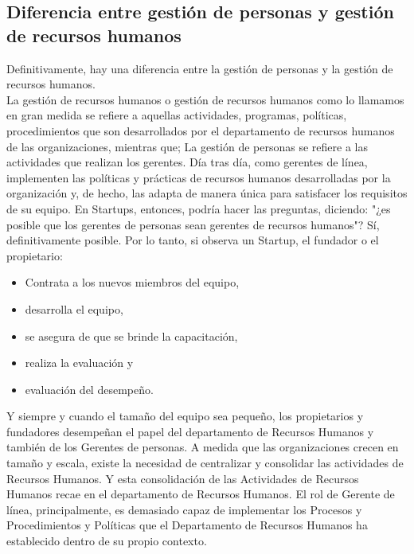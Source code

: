 \documentclass[10pt]{book}
\begin{document}
\subsection{Diferencia entre gestión de personas y gestión de recursos humanos}
Definitivamente, hay una diferencia entre la gestión de personas y la gestión de recursos humanos.\\
La gestión de recursos humanos o gestión de recursos humanos como lo llamamos en gran medida se refiere a aquellas actividades, programas, políticas, procedimientos que son desarrollados por el departamento de recursos humanos de las organizaciones, mientras que; La gestión de personas se refiere a las actividades que realizan los gerentes. Día tras día, como gerentes de línea, implementen las políticas y prácticas de recursos humanos desarrolladas por la organización y, de hecho, las adapta de manera única para satisfacer los requisitos de su equipo. En Startups, entonces, podría hacer las preguntas, diciendo: "¿es posible que los gerentes de personas sean gerentes de recursos humanos"? Sí, definitivamente posible. Por lo tanto, si observa un Startup, el fundador o el propietario: 
\begin{itemize}
\item Contrata a los nuevos miembros del equipo,
\item desarrolla el equipo,
\item se asegura de que se brinde la capacitación,
\item realiza la evaluación y
\item evaluación del desempeño.
\end{itemize}    
Y siempre y cuando el tamaño del equipo sea pequeño, los propietarios y fundadores desempeñan el papel del departamento de Recursos Humanos y también de los Gerentes de personas. A medida que las organizaciones crecen en tamaño y escala, existe la necesidad de centralizar y consolidar las actividades de Recursos Humanos. Y esta consolidación de las Actividades de Recursos Humanos recae en el departamento de Recursos Humanos. El rol de Gerente de línea, principalmente, es demasiado capaz de implementar los Procesos y Procedimientos y Políticas que el Departamento de Recursos Humanos ha establecido dentro de su propio contexto.
\end{document}
